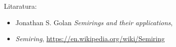 \documentclass[t, 11pt]{beamer} %
\begin{document}
\begin{frame}{Litaratura:}
	\begin{itemize}
		\item Jonathan S. Golan {\em Semirings and their applications},
		\item {\em Semiring}, \url{https://en.wikipedia.org/wiki/Semiring}
	\end{itemize}

\end{frame}
\end{document}
